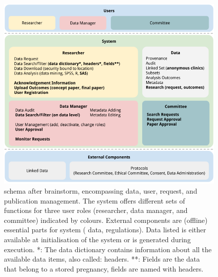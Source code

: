 \begin{figure}[!h]
	\centering
	\includegraphics[width=1.0\linewidth]{images/brainstorm-after}
	\caption{
		\ivfsystem{} schema after brainstorm, encompassing data, user, request, and publication management.
		The system offers different sets of functions for three user roles (researcher, data manager, and committee) indicated by colours. 
		External components are (offline) essential parts for system (\eg{} data, regulations).
		Data listed is either available at initialisation of the system or is generated during execution.
		*: The data dictionary contains information about all the available data items, also called: headers.
		**: Fields are the data that belong to a stored pregnancy, fields are named with headers.
	}
	\label{fig:brainstorm-after}
\end{figure}